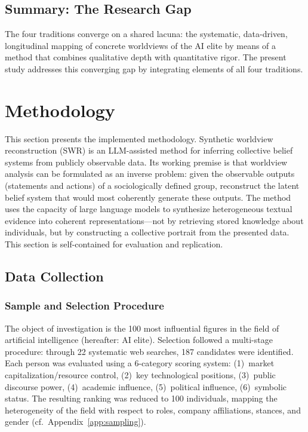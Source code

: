 \documentclass[12pt,a4paper]{article}
\begin{document}
\subsection{Summary: The Research Gap}
\label{sec:forschungsstand:luecke}

The four traditions converge on a shared lacuna: the systematic, data-driven, longitudinal mapping of concrete worldviews of the AI elite by means of a method that combines qualitative depth with quantitative rigor. The present study addresses this converging gap by integrating elements of all four traditions.


\section{Methodology}
\label{sec:methodik}

This section presents the implemented methodology. Synthetic worldview reconstruction (SWR) is an LLM-assisted method for inferring collective belief systems from publicly observable data. Its working premise is that worldview analysis can be formulated as an inverse problem: given the observable outputs (statements and actions) of a sociologically defined group, reconstruct the latent belief system that would most coherently generate these outputs. The method uses the capacity of large language models to synthesize heterogeneous textual evidence into coherent representations---not by retrieving stored knowledge about individuals, but by constructing a collective portrait from the presented data. This section is self-contained for evaluation and replication.


\subsection{Data Collection}
\label{sec:methodik:daten}

\subsubsection{Sample and Selection Procedure}

The object of investigation is the 100 most influential figures in the field of artificial intelligence (hereafter: AI elite). Selection followed a multi-stage procedure: through 22 systematic web searches, 187 candidates were identified. Each person was evaluated using a 6-category scoring system: (1)~market capitalization/resource control, (2)~key technological positions, (3)~public discourse power, (4)~academic influence, (5)~political influence, (6)~symbolic status. The resulting ranking was reduced to 100 individuals, mapping the heterogeneity of the field with respect to roles, company affiliations, stances, and gender (cf.\ Appendix~\ref{app:sampling}).
\end{document}
